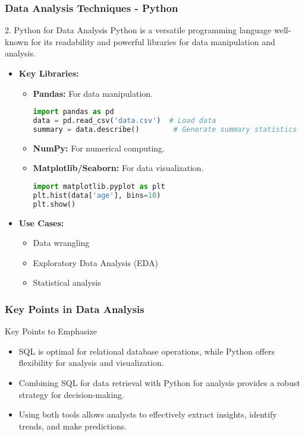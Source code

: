 \documentclass{beamer}
\begin{document}
\begin{frame}[fragile]
    \frametitle{Data Analysis Techniques - Python}
    \begin{block}{2. Python for Data Analysis}
        Python is a versatile programming language well-known for its 
        readability and powerful libraries for data manipulation and analysis.
    \end{block}
    
    \begin{itemize}
        \item \textbf{Key Libraries:}
            \begin{itemize}
                \item \textbf{Pandas:} For data manipulation.
                    \begin{lstlisting}[language=Python]
import pandas as pd
data = pd.read_csv('data.csv')  # Load data
summary = data.describe()        # Generate summary statistics
                    \end{lstlisting}
                \item \textbf{NumPy:} For numerical computing.
                \item \textbf{Matplotlib/Seaborn:} For data visualization.
                    \begin{lstlisting}[language=Python]
import matplotlib.pyplot as plt
plt.hist(data['age'], bins=10)
plt.show()
                    \end{lstlisting}
            \end{itemize}
        
        \item \textbf{Use Cases:}
            \begin{itemize}
                \item Data wrangling
                \item Exploratory Data Analysis (EDA)
                \item Statistical analysis
            \end{itemize}
    \end{itemize}
\end{frame}

\begin{frame}[fragile]
    \frametitle{Key Points in Data Analysis}
    \begin{block}{Key Points to Emphasize}
        \begin{itemize}
            \item SQL is optimal for relational database operations, while Python offers flexibility for analysis and visualization.
            \item Combining SQL for data retrieval with Python for analysis provides a robust strategy for decision-making.
            \item Using both tools allows analysts to effectively extract insights, identify trends, and make predictions.
        \end{itemize}
    \end{block}
\end{frame}
\end{document}
